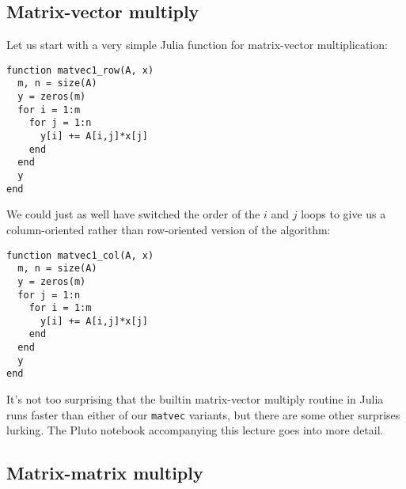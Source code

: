 \documentclass[12pt, leqno]{article} %
\begin{document}
\subsection{Matrix-vector multiply}

Let us start with a very simple Julia function for matrix-vector
multiplication:
\begin{lstlisting}
function matvec1_row(A, x)
  m, n = size(A)
  y = zeros(m)
  for i = 1:m
    for j = 1:n
      y[i] += A[i,j]*x[j]
    end
  end
  y
end
\end{lstlisting}
We could just as well have switched the order of the $i$ and $j$ loops
to give us a column-oriented rather than row-oriented version of the
algorithm:
\begin{lstlisting}
function matvec1_col(A, x)
  m, n = size(A)
  y = zeros(m)
  for j = 1:n
    for i = 1:m
      y[i] += A[i,j]*x[j]
    end
  end
  y
end
\end{lstlisting}

It's not too surprising that the builtin matrix-vector multiply routine in
Julia runs faster than either of our {\tt matvec} variants, but there
are some other surprises lurking.  The Pluto notebook accompanying
this lecture goes into more detail.

\subsection{Matrix-matrix multiply}
\end{document}
